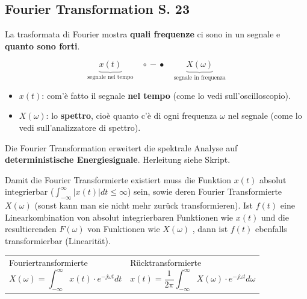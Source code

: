 \subsection{Fourier Transformation S. 23}

La trasformata di Fourier mostra \textbf{quali frequenze} ci sono in un segnale
e \textbf{quanto sono forti}.

\[
\underbrace{x(t)}_{\text{segnale nel tempo}}
\quad \circ\!\!-\!\!\bullet \quad
\underbrace{X(\omega)}_{\text{segnale in frequenza}}
\]

\begin{itemize}
  \item $x(t)$: com'è fatto il segnale \textbf{nel tempo} (come lo vedi sull'oscilloscopio).
  \item $X(\omega)$: lo \textbf{spettro}, cioè quanto c'è di ogni frequenza $\omega$ nel segnale
        (come lo vedi sull'analizzatore di spettro).
\end{itemize}

Die Fourier Transformation erweitert die spektrale Analyse auf \textbf{deterministische Energiesignale}. Herleitung siehe Skript.

Damit die Fourier Transformierte existiert muss die Funktion $x(t)$ absolut integrierbar ($\int_{-\infty}^{\infty} |x(t)| dt \leq \infty$) sein, sowie deren Fourier Transformierte $X(\omega)$ (sonst kann man sie nicht mehr zurück transformieren). Ist $f(t)$ eine Linearkombination von absolut integrierbaren Funktionen wie $x(t)$ und die resultierenden $F(\omega)$ von Funktionen wie $X(\omega)$ , dann ist $f(t)$ ebenfalls transformierbar (Linearität).
\begin{table}[H]
	\begin{tabularx}{\textwidth}{X X}
		\begin{minipage}{\linewidth}
			Fouriertransformierte
			\begin{equation*}
				X(\omega) = \int_{-\infty}^{\infty} x(t) \cdot e^{-j\omega t}dt
			\end{equation*}
		\end{minipage}
		&
		\begin{minipage}{\linewidth}
			Rücktransformierte
			\begin{equation*}
				x(t) = \frac{1}{2\pi}\int_{-\infty}^{\infty} X(\omega) \cdot e^{-j\omega t}d\omega
			\end{equation*}
	\end{minipage}
	\end{tabularx}
\end{table}



